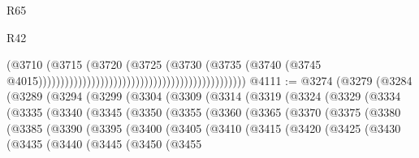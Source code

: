 \begin{lexlean}{R65}
\begin{lexlean}{R42}
\begin{coremodule}
{{{{{{{{{{{{{{{{{{{{{{{{{{{{{{{{{{{{{{{{{{{{{{{{{{{{{{{{{{{{{{{{{{{{{{{{{{{{{{{{{{{{{{{{{{{{{{{{{{{{{{{{{{{{{{{{{{{{{{{{{{{{{{{{{{{{{{{{{{{{{{{{{{{{{{{{{{{{{{{{{{{{{{{{{{{{{{{{{{{{{{{{                                                                                  (@3710
                                                                                    (@3715
                                                                                      (@3720
                                                                                        (@3725
                                                                                          (@3730
                                                                                            (@3735
                                                                                              (@3740
                                                                                                (@3745
                                                                                                  @4015)))))))))))))))))))))))))))))))))))))))))))))))
@4111 := @3274
    (@3279
      (@3284
        (@3289
          (@3294
            (@3299
              (@3304
                (@3309
                  (@3314
                    (@3319
                      (@3324
                        (@3329
                          (@3334
                            (@3335
                              (@3340
                                (@3345
                                  (@3350
                                    (@3355
                                      (@3360
                                        (@3365
                                          (@3370
                                            (@3375
                                              (@3380
                                                (@3385
                                                  (@3390
                                                    (@3395
                                                      (@3400
                                                        (@3405
                                                          (@3410
                                                            (@3415
                                                              (@3420
                                                                (@3425
                                                                  (@3430
                                                                    (@3435
                                                                      (@3440
                                                                        (@3445
                                                                          (@3450
                                                                            (@3455
}}}}}}}}}}}}}}}}}}}}}}}}}}}}}}}}}}}}}}}}}}}}}}}}}}}}}}}}}}}}}}}}}}}}}}}}}}}}}}}}}}}}}}}}}}}}}}}}}}}}}}}}}}}}}}}}}}}}}}}}}}}}}}}}}}}}}}}}}}}}}}}}}}}}}}}}}}}}}}}}}}}}}}}}}}}}}}}}}}}}}}}}
\end{coremodule}
\end{lexlean}
\end{lexlean}
